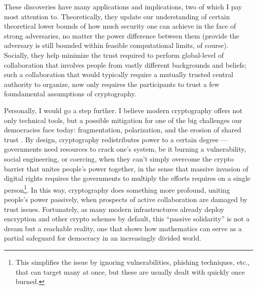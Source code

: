 \documentclass[10pt]{article}
\begin{document}
These discoveries have many applications and implications, two of which I pay
most attention to. Theoretically, they update our understanding of certain
theoretical lower bounds of how much security one can achieve in the face of
strong adversaries, no matter the power difference between them (provide the
adversary is still bounded within feasible computational limits, of course).
Socially, they help minimize the trust required to perform global-level
of collaboration that involves people from vastly different backgrounds and
beliefs; such a collaboration that would typically require a mutually trusted
central authority to organize, now only requires the participants to trust a
few foundamental assumptions of cryptography.

Personally, I would go a step further. I believe modern cryptography offers not
only technical tools, but a possible mitigation for one of the big
challenges our democracies face today: fragmentation, polarization, and the
erosion of shared trust \cite{trust.book.fukuyama, how.democracies.die,
cultural.backlash}. By
design, cryptography redistributes power to a certain degree --- governments
need resources to crack one's system, be it burning a vulnerability, social
engineering, or coercing, when they can't simply overcome the crypto barrier
that unites people's power together, in the sense that massive
invasion of digital rights requires the governments to multiply the efforts
requires on a single person\footnote{This simplifies the issue by ignoring
vulnerabilities, phishing techniques, etc., that can target many at once, but
these are usually dealt with quickly once burned.}. In this way, cryptography
does something more profound, uniting people's power passively, when prospects
of active collaboration are damaged by trust issues.  Fortunately, as many
modern infrastructures already deploy encryption and other crypto schemes by
default, this ``passive solidarity'' is not a dream but a reachable reality,
one that shows how mathematics can serve as a partial safeguard for democracy
in an increasingly divided world.
\end{document}

